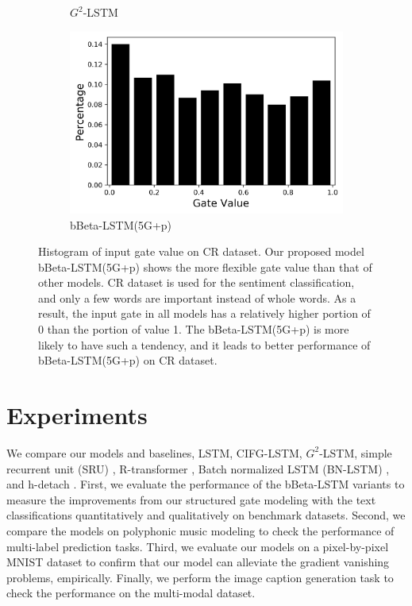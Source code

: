 \documentclass[letterpaper]{article} %
\begin{document}
\begin{figure}[h]
\begin{subfigure}{.48\columnwidth}
		\caption{$G^{2}$-LSTM} 
	\end{subfigure}
	\begin{subfigure}{.48\columnwidth}
		\centering
		\includegraphics[width=\linewidth]{sample_cr_tr_input_bBLSTM_5G.png}
		\caption{bBeta-LSTM(5G+p)}
	\end{subfigure}
	\caption{Histogram of input gate value on CR dataset. Our proposed model bBeta-LSTM(5G+p) shows the more flexible gate value than that of other models. CR dataset is used for the sentiment classification, and only a few words are important instead of whole words. As a result, the input gate in all models has a relatively higher portion of 0 than the portion of value 1. The bBeta-LSTM(5G+p) is more likely to have such a tendency, and it leads to better performance of bBeta-LSTM(5G+p) on CR dataset. 
	}
	\label{fig:cr_gate_histogram}
\end{figure}
\section{Experiments}
We compare our models and baselines, LSTM, CIFG-LSTM, $G^{2}$-LSTM, simple recurrent unit (SRU) \cite{sru}, R-transformer \cite{wang2019rtransf}, Batch normalized LSTM (BN-LSTM) \cite{cooijmans2016recurrent}, and h-detach \cite{hdetach2019}.
First, we evaluate the performance of the bBeta-LSTM variants to measure the improvements from our structured gate modeling with the text classifications quantitatively and qualitatively on benchmark datasets. 
Second, we compare the models on polyphonic music modeling to check the performance of multi-label prediction tasks.
Third, we evaluate our models on a pixel-by-pixel MNIST dataset to confirm that our model can alleviate the gradient vanishing problems, empirically.
Finally, we perform the image caption generation task to check the performance on the multi-modal dataset.
\end{document}
